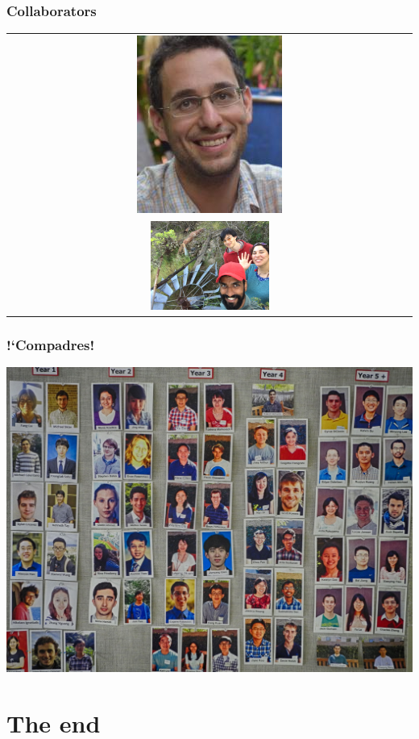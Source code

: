 \documentclass{beamer}
\begin{document}
\begin{frame}
\frametitle{Collaborators}
\begin{center}
\begin{tabular}{c}
\includegraphics[scale = 0.5]{yuval_b.jpg}\\
\includegraphics[width = 0.3\textwidth]{image3.JPG}
\end{tabular}
\end{center}
\end{frame}

\begin{frame}
\frametitle{{!`}Compadres!}
\begin{center}
\includegraphics[scale = 0.08]{DSCN3957-HDR.jpg}
\end{center}
\end{frame}

\section*{The end}

\begin{frame}
\sectionpage
\end{frame}
\end{document}

